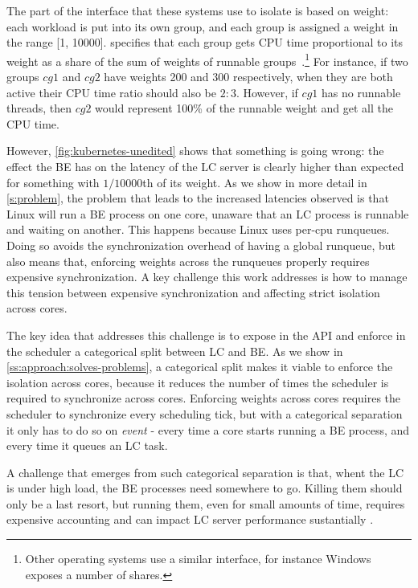 The part of the \cgroups{} interface that these systems use to isolate is based
on weight: each workload is put into its own group, and each group is assigned a
weight in the range [1, 10000]. \cgroups{} specifies that each group gets CPU
time proportional to its weight as a share of the sum of weights of runnable
groups~\cite{cgroups-kerneldocs}.\footnote{Other operating systems use a similar
interface, for instance Windows exposes a number of shares.} For instance, if
two groups $cg1$ and $cg2$ have weights 200 and 300 respectively, when they are
both active their CPU time ratio should also be $2:3$. However, if $cg1$ has no
runnable threads, then $cg2$ would represent 100\% of the runnable weight and
get all the CPU time.

However, \autoref{fig:kubernetes-unedited} shows that something is going wrong:
the effect the BE has on the latency of the LC server is clearly higher than
expected for something with $1/10000$th of its weight. As we show in more detail
in \autoref{s:problem}, the problem that leads to the increased latencies
observed is that Linux will run a BE process on one core, unaware that an LC
process is runnable and waiting on another. This happens because Linux uses
per-cpu runqueues. Doing so avoids the synchronization overhead of having a
global runqueue, but also means that, enforcing weights across the runqueues
properly requires expensive synchronization. A key challenge this work addresses
is how to manage this tension between expensive synchronization and affecting
strict isolation across cores.

The key idea that addresses this challenge is to expose in the API and enforce
in the scheduler a categorical split between LC and BE. As we show in
\autoref{ss:approach:solves-problems}, a categorical split makes it viable to
enforce the isolation across cores, because it reduces the number of times the
scheduler is required to synchronize across cores. Enforcing weights across
cores requires the scheduler to synchronize every scheduling tick, but with a
categorical separation it only has to do so on \textit{event} - every time a
core starts running a BE process, and every time it queues an LC task.

A challenge that emerges from such categorical separation is that, whent the LC
is under high load, the BE processes need somewhere to go. Killing them should
only be a last resort, but running them, even for small amounts of time,
requires expensive accounting and can impact LC server performance sustantially
. 

